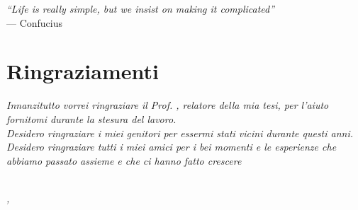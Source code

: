 \cleardoublepage
{}
{}

\begin{flushright}{
    \slshape
    ``Life is really simple, but we insist on making it complicated''} \\
    \medskip
    --- Confucius
\end{flushright}


\bigskip

\begingroup
\let\clearpage\relax
\let\cleardoublepage\relax
\let\cleardoublepage\relax

\chapter*{Ringraziamenti}

\noindent \textit{Innanzitutto vorrei ringraziare il Prof. \myProf, relatore della mia tesi, per l'aiuto fornitomi durante la stesura del lavoro.}\\

\noindent \textit{Desidero ringraziare i miei genitori per essermi stati vicini durante questi anni.}\\

\noindent \textit{Desidero ringraziare tutti i miei amici per i bei momenti e le esperienze che abbiamo passato assieme e che ci hanno fatto crescere}\\

\noindent \textit{}\\
\bigskip

\noindent\textit{\myLocation, \myTime}
\hfill \myName

\endgroup
